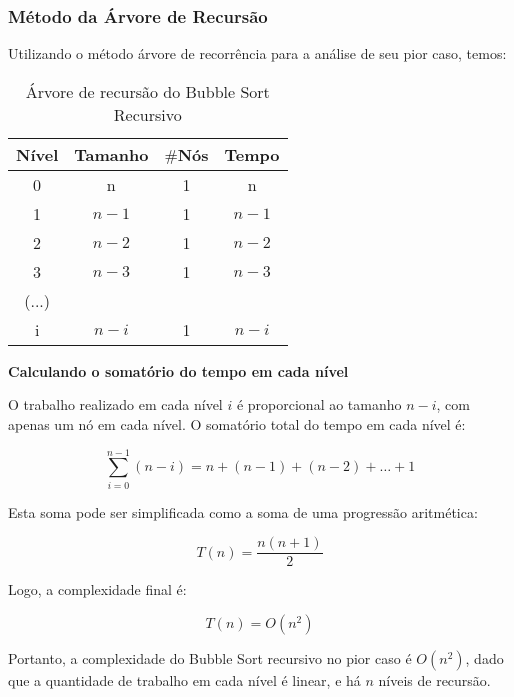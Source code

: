 \subsubsection{Método da Árvore de Recursão}

Utilizando o método árvore de recorrência para a análise de seu pior caso, temos:

\begin{table}[ht!]
    \centering
    \begin{tabular}{|c|c|c|c|}
    \hline
    \textbf{Nível} & \textbf{Tamanho} & $\#$\textbf{Nós} & \textbf{Tempo} \\ \hline
     0 & n & 1 & n \\ \hline
     1 & $n - 1$ & 1 & $n - 1$ \\ \hline
     2 & $n - 2$ & 1 & $n - 2$ \\ \hline
     3 & $n - 3$ & 1 & $n - 3$ \\ \hline
     (...) & & & \\ \hline
     i & $n - i$ & 1 & $n - i$ \\ \hline 
    \end{tabular}  
    \caption{Árvore de recursão do Bubble Sort Recursivo}
\end{table}

\textbf{Calculando o somatório do tempo em cada nível}

O trabalho realizado em cada nível \(i\) é proporcional ao tamanho \( n - i \), com apenas um nó em cada nível. O somatório total do tempo em cada nível é:

\[
\sum_{i=0}^{n-1} (n - i) = n + (n-1) + (n-2) + \dots + 1
\]

Esta soma pode ser simplificada como a soma de uma progressão aritmética:

\[
T(n) = \frac{n(n+1)}{2}
\]

Logo, a complexidade final é:

\[
T(n) = O(n^2)
\]

Portanto, a complexidade do Bubble Sort recursivo no pior caso é \( O(n^2) \), dado que a quantidade de trabalho em cada nível é linear, e há \( n \) níveis de recursão.
